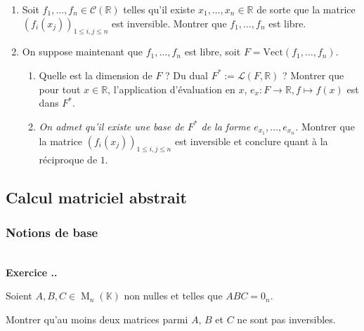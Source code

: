 \documentclass{article}
\newcommand{\mb}[1]{\mathbb{#1}}
\newcommand{\mc}[1]{\mathcal{#1}}
\renewcommand{\M}{\operatorname{M}}
\newcounter{exo}
\newcommand{\exercice}[1][\null]{\textbf{\\ Exercice \thesection.\theexo. #1} \addtocounter{exo}{1}}
\begin{document}
\begin{enumerate}

\item Soit $f_1,\dots, f_n \in \mc{C}(\mb{R}) $  telles qu'il existe $x_1, \dots, x_n \in \mb{R}$ de sorte que la matrice $(f_i(x_j))_{1 \le i,j \le n}$ est inversible. Montrer que $f_1,\dots, f_n$ est libre.

\item On suppose maintenant que  $f_1,\dots, f_n$ est libre, soit $F = \text{Vect}(f_1, \dots, f_n)$. 

\begin{enumerate}

\item Quelle est la dimension de $F$ ? Du dual $F^* := \mc{L}(F, \mb{R})$ ? Montrer que pour tout $x \in \mb{R}$, l'application d'évaluation en $x$, $e_x : F \rightarrow \mb{R}, f \mapsto f(x) $ est dans $F^*$.

\item \emph{On admet qu'il existe une base de $F^*$ de la forme $e_{x_1}, \dots, e_{x_n}$.} Montrer que la matrice $(f_i(x_j))_{1 \le i,j \le n}$ est inversible et conclure quant à la réciproque de $1$.

\end{enumerate}


\end{enumerate}





















\subsection{Calcul matriciel abstrait}

\subsubsection{Notions de base}


\exercice

Soient $A, B, C \in \M_n(\mb{K})$ non nulles et telles que $ABC = 0_n$.

Montrer qu'au moins deux matrices parmi $A$, $B$ et $C$ ne sont pas inversibles.
\end{document}
